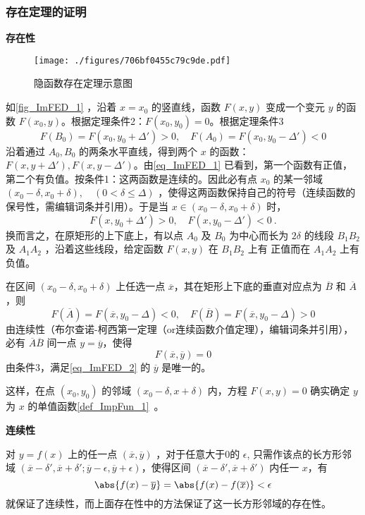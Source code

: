 \subsubsection{存在定理的证明}
\textbf{存在性}
\begin{figure}[ht]
\centering
\texttt{[image: ./figures/706bf0455c79c9de.pdf]}
\caption{隐函数存在定理示意图} \label{fig_ImFED_1}
\end{figure}
如\autoref{fig_ImFED_1} ，沿着 $x=x_0$ 的竖直线，函数 $F(x,y)$ 变成一个变元 $y$ 的函数 $F(x_0,y)$。根据定理条件2：$F(x_0,y_0)=0$。根据定理条件3
\begin{equation}\label{eq_ImFED_1}
F(B_0)=F(x_0,y_0+\Delta')>0,\quad F(A_0)=F(x_0,y_0-\Delta')<0
\end{equation}
沿着通过 $A_0,B_0$ 的两条水平直线，得到两个 $x$ 的函数：$F(x,y+\Delta'),F(x,y-\Delta')$。由\autoref{eq_ImFED_1} 已看到，第一个函数有正值，第二个有负值。按条件1：这两函数是连续的。因此必有点 $x_0$ 的某一邻域 $(x_0-\delta,x_0+\delta),\quad(0<\delta\leq\Delta)$ ，使得这两函数保持自己的符号（连续函数的保号性，需编辑词条并引用）。于是当 $x\in(x_0-\delta,x_0+\delta)$ 时，
\begin{equation}
F(x,y_0+\Delta')>0,\quad F(x,y_0-\Delta')<0~.
\end{equation}
换而言之，在原矩形的上下底上，有以点 $A_0$ 及 $B_0$ 为中心而长为 $2\delta$ 的线段  $B_1B_2$ 及 $A_1A_2$ ，沿着这些线段，给定函数 $F(x,y)$ 在 $B_1B_2$ 上有 正值而在 $A_1A_2$ 上有负值。

在区间 $(x_0-\delta,x_0+\delta)$ 上任选一点 $\overline{x}$，其在矩形上下底的垂直对应点为 $\overline{B}$ 和 $\overline{A}$，则
\begin{equation}
F(\overline{A})=F(\overline{x},y_0-\Delta)<0,\quad F(\overline{B})=F(\overline{x},y_0-\Delta)>0
\end{equation}
由连续性（布尔查诺-柯西第一定理（or连续函数介值定理），编辑词条并引用），必有 $\overline{A}\overline{B}$ 间一点 $y=\overline{y}$，使得
\begin{equation}\label{eq_ImFED_2}
F(\overline{x},\overline{y})=0
\end{equation}
由条件3，满足\autoref{eq_ImFED_2} 的 $\overline{y}$ 是唯一的。

这样，在点 $(x_0,y_0)$ 的邻域 $(x_0-\delta,x+\delta)$ 内，方程 $F(x,y)=0$ 确实确定 $y$ 为 $x$ 的单值函数\autoref{def_ImpFun_1}~。

\textbf{连续性}

对 $y=f(x)$ 上的任一点 $(\overline{x},\overline{y})$ ，对于任意大于0的 $\epsilon$, 只需作该点的长方形邻域 $(\overline{x}-\delta',\overline{x}+\delta';\overline{y}-\epsilon,\overline{y}+\epsilon)$，使得区间 $(\overline{x}-\delta',\overline{x}+\delta')$ 内任一 $x$，有
\begin{equation}
\abs{f(x)-\overline{y}}=\abs{f(x)-f(\overline{x})}<\epsilon
\end{equation}
就保证了连续性，而上面存在性中的方法保证了这一长方形邻域的存在性。

